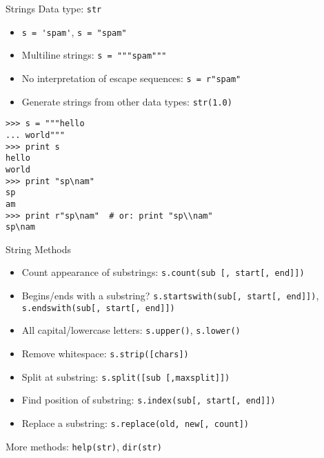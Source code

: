 \begin{frame}[fragile]{Strings}
Data type: \alert{\lstinline{str}}
\begin{itemize}
\item \lstinline{s = 'spam'}, \lstinline{s = "spam"}
\item Multiline strings: \lstinline{s = """spam"""}
\item No interpretation of escape sequences: \lstinline{s = r"spam"}
\item Generate strings from other data types: \lstinline{str(1.0)}
\end{itemize}
\begin{lstlisting}[style=Shell]
>>> s = """hello
... world"""
>>> print s
hello
world
>>> print "sp\nam"
sp
am
>>> print r"sp\nam"  # or: print "sp\\nam"
sp\nam
\end{lstlisting}
\end{frame}

\begin{frame}{String Methods}
\begin{itemize}
\item Count appearance of substrings: \lstinline{s.count(sub [, start[, end]])}
\item Begins/ends with a substring? \lstinline{s.startswith(sub[, start[, end]])}, \lstinline{s.endswith(sub[, start[, end]])}
\item All capital/lowercase letters: \lstinline{s.upper()}, \lstinline{s.lower()}
\item Remove whitespace: \lstinline{s.strip([chars])}
\item Split at substring: \lstinline{s.split([sub [,maxsplit]])}
\item Find position of substring: \lstinline{s.index(sub[, start[, end]])}
\item Replace a substring: \lstinline{s.replace(old, new[, count])}
\end{itemize}
More methods: \lstinline{help(str)}, \lstinline{dir(str)}
\end{frame}

